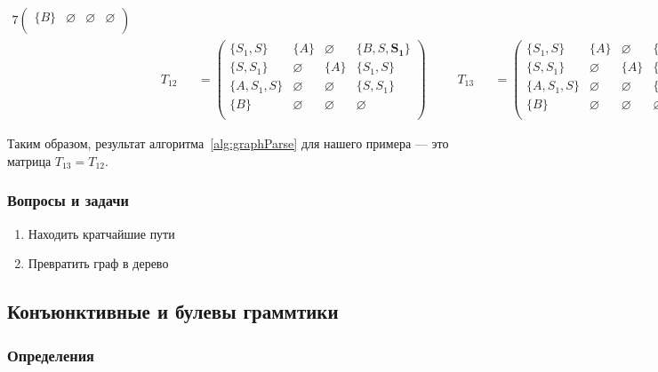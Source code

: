 \begin{example}
\begin{alignat*}{7}
\begin{pmatrix}
\{B\}       & \varnothing & \varnothing & \varnothing \\
\end{pmatrix} \\ & &&T_{12} &&= \begin{pmatrix}
\{S_1, S\}     & \{A\}       & \varnothing & \{B, S, \pmb{S_1}\}    \\
\{S, S_1\}       & \varnothing & \{A\}       & \{S_1, S\}     \\
\{A, S_1, S\}  & \varnothing & \varnothing & \{S, S_1\} \\
\{B\}       & \varnothing & \varnothing & \varnothing \\
\end{pmatrix} \ \ \ \ &&T_{13} &&= \begin{pmatrix}
\{S_1, S\}     & \{A\}       & \varnothing & \{B, S, S_1\}    \\
\{S, S_1\}       & \varnothing & \{A\}       & \{S_1, S\}     \\
\{A, S_1, S\}  & \varnothing & \varnothing & \{S, S_1\} \\
\{B\}       & \varnothing & \varnothing & \varnothing \\
\end{pmatrix}
\end{alignat*}

Таким образом, результат алгоритма~\ref{alg:graphParse} для нашего примера --- это матрица $T_{13} = T_{12}$. 

\end{example}

\subsubsection{Вопросы и задачи}
\begin{enumerate}
	\item Находить кратчайшие пути
	\item Превратить граф в дерево
\end{enumerate}
\subsection{Конъюнктивные и булевы граммтики}

\subsubsection{Определения}

